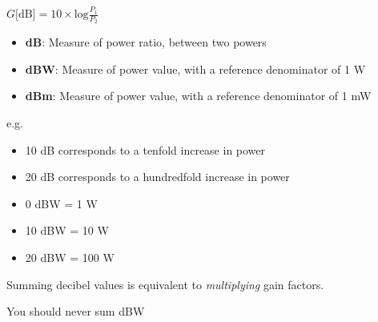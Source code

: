 \documentclass[12pt]{article}
\begin{document}
\begin{math}
    G \text{[dB]} = 10\times \text{log}\frac{P_1}{P_2}
\end{math}

\begin{itemize}[noitemsep]
    \item \textbf{dB}: Measure of power ratio, between two powers
    \item \textbf{dBW}: Measure of power value, with a reference denominator of 1 W
    \item \textbf{dBm}: Measure of power value, with a reference denominator of 1 mW
\end{itemize}

\begin{framed}
e.g.
\begin{itemize}[noitemsep]
    \item 10 dB corresponds to a tenfold increase in power
    \item 20 dB corresponds to a hundredfold increase in power
    \item 0 dBW = 1 W
    \item 10 dBW = 10 W
    \item 20 dBW = 100 W
\end{itemize}
\end{framed}

Summing decibel values is equivalent to \textit{multiplying} gain factors.

You should never sum dBW
\end{document}
